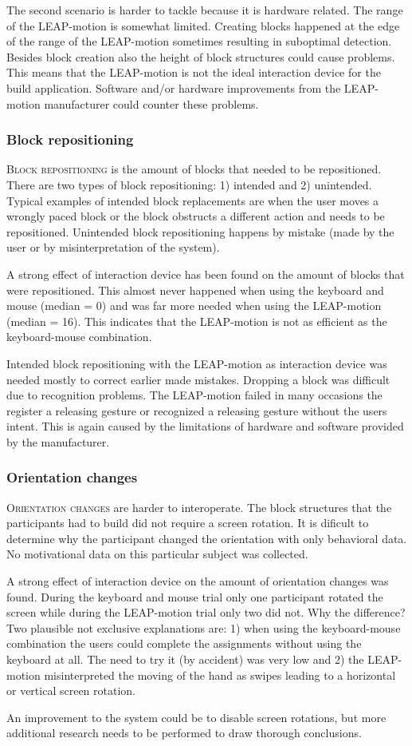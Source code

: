 The second scenario is harder to tackle because it is hardware related. The range of the LEAP-motion is somewhat limited. Creating blocks happened at the edge of the range of the LEAP-motion sometimes resulting in suboptimal detection. Besides block creation also the height of block structures could cause problems. This means that the LEAP-motion is not the ideal interaction device for the build application. Software and/or hardware improvements from the LEAP-motion manufacturer could counter these problems.

\subsubsection{Block repositioning}
\textsc{Block repositioning} is the amount of blocks that needed to be repositioned. There are two types of block repositioning: 1) intended and 2) unintended. Typical examples of intended block replacements are when the user moves a wrongly paced block or the block obstructs a different action and needs to be repositioned. Unintended block repositioning happens by mistake (made by the user or by misinterpretation of the system).

A strong effect of interaction device has been found on the amount of blocks that were repositioned. This almost never happened when using the keyboard and mouse (median = 0) and was far more needed when using the LEAP-motion (median = 16). This indicates that the LEAP-motion is not as efficient as the keyboard-mouse combination.

Intended block repositioning with the LEAP-motion as interaction device was needed mostly to correct earlier made mistakes. Dropping a block was difficult due to recognition problems. The LEAP-motion failed in many occasions the register a releasing gesture or recognized a releasing gesture without the users intent. This is again caused by the limitations of hardware and software provided by the manufacturer.

\subsubsection{Orientation changes} 
\textsc{Orientation changes} are harder to interoperate. The block structures that the participants had to build did not require a screen rotation. It is dificult to determine why the participant changed the orientation with only behavioral data. No motivational data on this particular subject was collected.

A strong effect of interaction device on the amount of orientation changes was found. During the keyboard and mouse trial only one participant rotated the screen while during the LEAP-motion trial only two did not. Why the difference? Two plausible not exclusive explanations are: 1) when using the keyboard-mouse combination the users could complete the assignments without using the keyboard at all. The need to try it (by accident) was very low and 2) the LEAP-motion misinterpreted the moving of the hand as swipes leading to a horizontal or vertical screen rotation. 

An improvement to the system could be to disable screen rotations, but more additional research needs to be performed to draw thorough conclusions.
